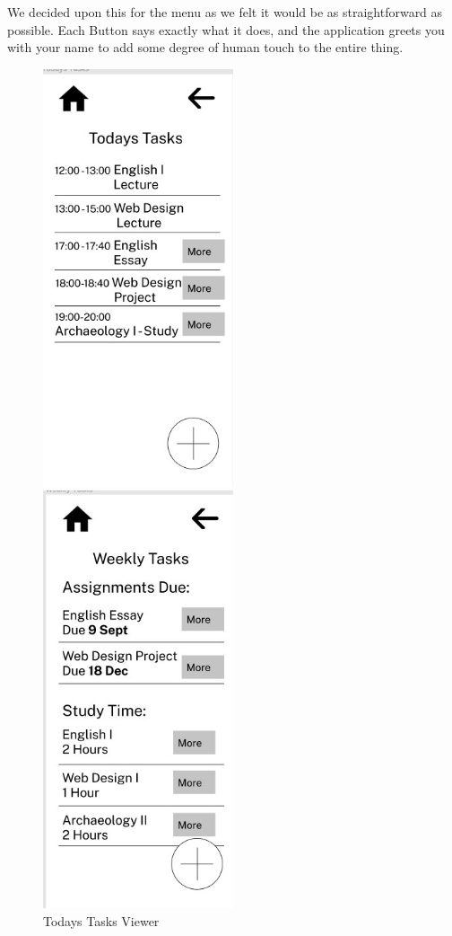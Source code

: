\documentclass{article}
\begin{document}
	We decided upon this for the menu as we felt it would be as straightforward as possible. Each Button says exactly what it does, and the application greets you with your name to add some degree of human touch to the entire thing. \newpage
	\begin{figure}[h!]
		\centering
		\begin{minipage}{0.5\textwidth}
			\centering
			\includegraphics[width=0.5\textwidth]{todaystasks.jpg}
			\caption{Todays Tasks Viewer}
		\end{minipage}%
		\begin{minipage}{0.5\textwidth}
			\centering
			\includegraphics[width=0.5\textwidth]{weeklytasks.jpg}

\end{minipage}
\end{figure}
\end{document}
